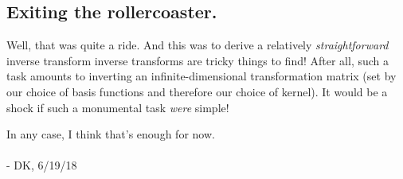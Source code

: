 \documentclass[../main/main.tex]{subfiles}
\begin{document}
\subsection{Exiting the rollercoaster.}
Well, that was quite a ride.
And this was to derive a relatively \emph{straightforward}
inverse transform \textemdash{}
inverse transforms are tricky things
to find! After all, such a task amounts to inverting
an infinite-dimensional transformation matrix
(set by our choice of basis functions and therefore our choice
of kernel).
It would be a shock if such a 
monumental task \emph{were} simple!\par

In any case, I think that's enough for now.
\\
\\
- DK, 6/19/18
\end{document}
